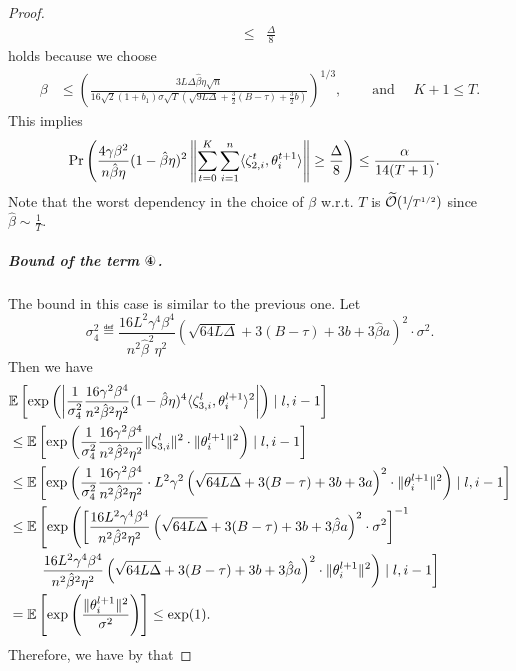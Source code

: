 \documentclass[a4paper,11pt]{article}
\begin{document}
\begin{proof}
\begin{align*}
    \le& \frac{\Delta}{8}
    \end{align*}
    holds because we choose 
    \begin{align}\label{eq:stepsize_bound_3}
    \beta &\le \left(\frac{3L\Delta\hat{\beta}\eta \sqrt{n}}{16\sqrt{2}(1+b_1)\sigma\sqrt{T}\left(\sqrt{9L\Delta} + \frac{3}{2}(B-\tau) + \frac{3}{2}b\right)}\right)^{1/3},
    &\quad \text{ and } \quad K+1 \le T.
    \end{align}
    This implies 
    \begin{align*}
    &\Pr\left(\frac{4\gamma\beta^2}{n\hat{\beta}\eta}(1-\hat{\beta}\eta)^2\left\|\sum_{t=0}^K\sum_{i=1}^n\<\zeta_{2,i}^t,\theta^{t+1}_i>\right\| \ge \frac{\Delta}{8}\right) \le \frac{\alpha}{14(T+1)}.
    \end{align*}
    Note that the worst dependency in the choice of $\beta$ w.r.t. $T$ is $\widetilde{\mathcal O}(\nicefrac{1}{T^{1/2}})$ since $\hat{\beta} \sim \frac{1}{T}.$
    \subparagraph{Bound of the term $\circledFour$.} The bound in this case is similar to the previous one. Let
    \[
    \sigma_4^2 \eqdef \frac{16L^2\gamma^4\beta^4}{n^2\hat{\beta}^2\eta^2}\left(\sqrt{64L\Delta} + 3(B-\tau) + 3b + 3\hat{\beta}a\right)^2\cdot\sigma^2.
    \]
    Then we have
    \begin{align*}
    &\E{\exp\left(\left|\frac{1}{\sigma_4^2}\frac{16\gamma^2\beta^4}{n^2\hat{\beta}^2\eta^2}(1-\hat{\beta}\eta)^4\<\zeta^l_{3,i},\theta^{l+1}_i>^2\right| \right)\mid l,i-1}\\
    &\le 
    \E{\exp\left(\frac{1}{\sigma_4^2}\frac{16\gamma^2\beta^4}{n^2\hat{\beta}^2\eta^2}\|\zeta_{3,i}^l\|^2 \cdot \|\theta^{l+1}_i\|^2\right)\mid l,i-1}\\
    &\le \E{\exp\left(\frac{1}{\sigma_4^2}\frac{16\gamma^2\beta^4}{n^2\hat{\beta}^2\eta^2}\cdot L^2\gamma^2\left(\sqrt{64L\Delta} + 3(B-\tau) + 3b + 3a\right)^2\cdot \|\theta^{l+1}_i\|^2\right)\mid l,i-1}\\
    &\le \mathbb{E}\left[\exp\left(\left[\frac{16L^2\gamma^4\beta^4}{n^2\hat{\beta}^2\eta^2}\left(\sqrt{64L\Delta} + 3(B-\tau) + 3b + 3\hat{\beta}a\right)^2\cdot\sigma^2\right]^{-1} \right.\right.\\
    &\qquad \left.\left.\frac{16L^2\gamma^4\beta^4}{n^2\hat{\beta}^2\eta^2}\left(\sqrt{64L\Delta} + 3(B-\tau) + 3b + 3\hat{\beta}a\right)^2\cdot \|\theta^{l+1}_i\|^2\right)\mid l,i-1\right]\\
    &= \E{\exp\left(\frac{\|\theta^{l+1}_i\|^2}{\sigma^2}\right)} \le \exp(1).
    \end{align*}
    Therefore, we have by  that 

\end{proof}
\end{document}
